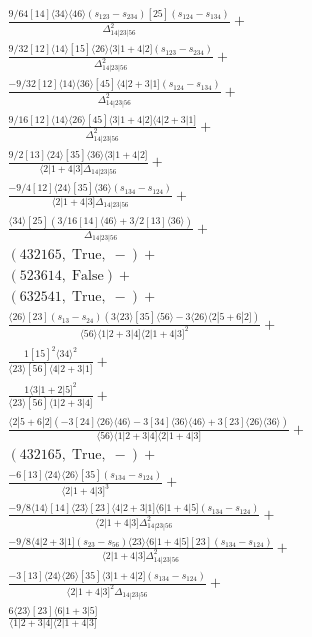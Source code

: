 \documentclass[varwidth, border=5pt]{standalone}
\begin{document}
\begin{my}
$\begin{gathered}
\scriptscriptstyle\frac{9/64[14]⟨34⟩⟨46⟩(s_{123}-s_{234})[25](s_{124}-s_{134})}{Δ_{14|23|56}^2}+\\
\scriptscriptstyle\frac{9/32[12]⟨14⟩[15]⟨26⟩⟨3|1+4|2](s_{123}-s_{234})}{Δ_{14|23|56}^2}+\\
\scriptscriptstyle\frac{-9/32[12]⟨14⟩⟨36⟩[45]⟨4|2+3|1](s_{124}-s_{134})}{Δ_{14|23|56}^2}+\\
\scriptscriptstyle\frac{9/16[12]⟨14⟩⟨26⟩[45]⟨3|1+4|2]⟨4|2+3|1]}{Δ_{14|23|56}^2}+\\
\scriptscriptstyle\frac{9/2[13]⟨24⟩[35]⟨36⟩⟨3|1+4|2]}{⟨2|1+4|3]Δ_{14|23|56}}+\\
\scriptscriptstyle\frac{-9/4[12]⟨24⟩[35]⟨36⟩(s_{134}-s_{124})}{⟨2|1+4|3]Δ_{14|23|56}}+\\
\scriptscriptstyle\frac{⟨34⟩[25](3/16[14]⟨46⟩+3/2[13]⟨36⟩)}{Δ_{14|23|56}}+\\
\scriptscriptstyle(432165,\;\text{True},\;-)+\\
\scriptscriptstyle(523614,\;\text{False})+\\
\scriptscriptstyle(632541,\;\text{True},\;-)+\\
\scriptscriptstyle\frac{⟨26⟩[23](s_{13}-s_{24})(3⟨23⟩[35]⟨56⟩-3⟨26⟩⟨2|5+6|2])}{⟨56⟩⟨1|2+3|4]⟨2|1+4|3]^2}+\\
\scriptscriptstyle\frac{1[15]^2⟨34⟩^2}{⟨23⟩[56]⟨4|2+3|1]}+\\
\scriptscriptstyle\frac{1⟨3|1+2|5]^2}{⟨23⟩[56]⟨1|2+3|4]}+\\
\scriptscriptstyle\frac{⟨2|5+6|2](-3[24]⟨26⟩⟨46⟩-3[34]⟨36⟩⟨46⟩+3[23]⟨26⟩⟨36⟩)}{⟨56⟩⟨1|2+3|4]⟨2|1+4|3]}+\\
\scriptscriptstyle(432165,\;\text{True},\;-)+\\
\scriptscriptstyle\frac{-6[13]⟨24⟩⟨26⟩[35](s_{134}-s_{124})}{⟨2|1+4|3]^3}+\\
\scriptscriptstyle\frac{-9/8⟨14⟩[14]⟨23⟩[23]⟨4|2+3|1]⟨6|1+4|5](s_{134}-s_{124})}{⟨2|1+4|3]Δ_{14|23|56}^2}+\\
\scriptscriptstyle\frac{-9/8⟨4|2+3|1](s_{23}-s_{56})⟨23⟩⟨6|1+4|5][23](s_{134}-s_{124})}{⟨2|1+4|3]Δ_{14|23|56}^2}+\\
\scriptscriptstyle\frac{-3[13]⟨24⟩⟨26⟩[35]⟨3|1+4|2](s_{134}-s_{124})}{⟨2|1+4|3]^2Δ_{14|23|56}}+\\
\scriptscriptstyle\frac{6⟨23⟩[23]⟨6|1+3|5]}{⟨1|2+3|4]⟨2|1+4|3]}\phantom{+}
\end{gathered}$
\end{my}
\end{document}
